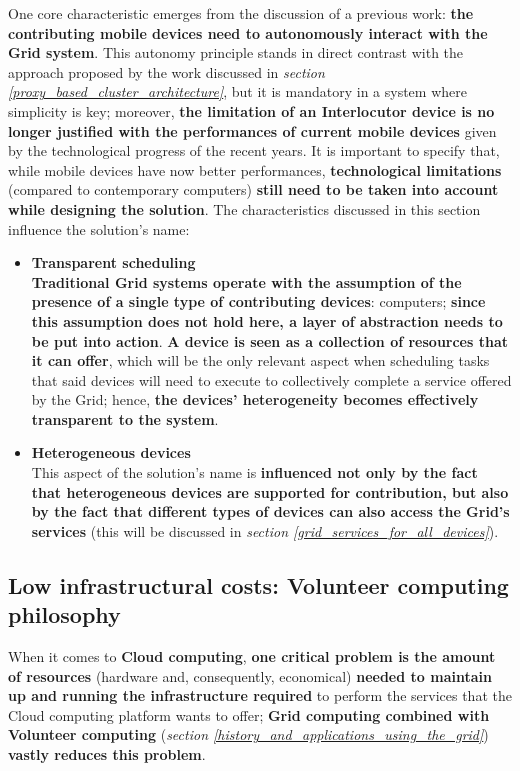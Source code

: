 One core characteristic emerges from the discussion of a previous work: \textbf{the contributing mobile devices need to autonomously interact with the Grid system}.
This autonomy principle stands in direct contrast with the approach proposed by the work discussed in \textit{section \ref{proxy_based_cluster_architecture}}, but it is mandatory in a system where simplicity is key; moreover, \textbf{the limitation of an Interlocutor device is no longer justified with the performances of current mobile devices} given by the technological progress of the recent years. It is important to specify that, while mobile devices have now better performances, \textbf{technological limitations} (compared to contemporary computers) \textbf{still need to be taken into account while designing the solution}.
The characteristics discussed in this section influence the solution's name:
\begin{itemize}
    \item \textbf{Transparent scheduling}\\
    \textbf{Traditional Grid systems operate with the assumption of the presence of a single type of contributing devices}: computers; \textbf{since this assumption does not hold here, a layer of abstraction needs to be put into action}. \textbf{A device is seen as a collection of resources that it can offer}, which will be the only relevant aspect when scheduling tasks that said devices will need to execute to collectively complete a service offered by the Grid; hence, \textbf{the devices' heterogeneity becomes effectively transparent to the system}.
    \item \textbf{Heterogeneous devices}\\
    This aspect of the solution's name is \textbf{influenced not only by the fact that heterogeneous devices are supported for contribution, but also by the fact that different types of devices can also access the Grid's services} (this will be discussed in \textit{section \ref{grid_services_for_all_devices}}).
\end{itemize}

\subsection{Low infrastructural costs: Volunteer computing philosophy}\label{low_infrastructural_costs_volunteer_computing_philosophy}
When it comes to \textbf{Cloud computing}, \textbf{one critical problem is the amount of resources} (hardware and, consequently, economical) \textbf{needed to maintain up and running the infrastructure required} to perform the services that the Cloud computing platform wants to offer; \textbf{Grid computing combined with Volunteer computing} (\textit{section \ref{history_and_applications_using_the_grid}}) \textbf{vastly reduces this problem}.

